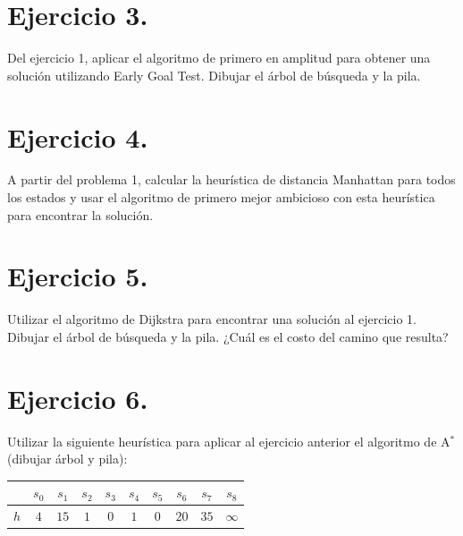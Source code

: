 \documentclass[12pt,letterpaper]{article}
\begin{document}
\newpage


\section{Ejercicio 3.}
Del ejercicio 1, aplicar el algoritmo de primero en amplitud para obtener una solución utilizando Early Goal Test. Dibujar el árbol de búsqueda y la pila.

\bigskip




\newpage


\section{Ejercicio 4.}
A partir del problema 1, calcular la heurística de distancia Manhattan para todos los estados y usar el algoritmo de primero mejor ambicioso con esta heurística para encontrar la solución.

\bigskip



\newpage


\section{Ejercicio 5.}
Utilizar el algoritmo de Dijkstra para encontrar una solución al ejercicio 1. Dibujar el árbol de búsqueda y la pila. ¿Cuál es el costo del camino que resulta?

\bigskip




\newpage


\section{Ejercicio 6.}
Utilizar la siguiente heurística para aplicar al ejercicio anterior el algoritmo de A$^*$ (dibujar árbol y pila):

\begin{center}
  \begin{tabular}{c|ccccccccc}
    & $s_0$ & $s_1$ & $s_2$ & $s_3$ & $s_4$ & $s_5$ & $s_6$ & $s_7$ & $s_8$ \\
    \hline
    $h$ & $4$ & $15$ & $1$ & $0$ & $1$ & $0$ & $20$ & $35$ & $\infty$
  \end{tabular}
\end{center}
\end{document}
